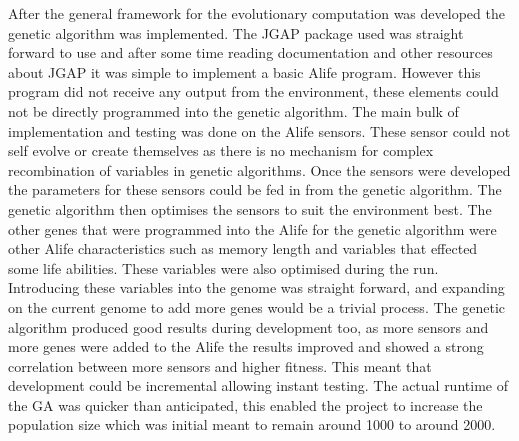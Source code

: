 \documentclass[12pt]{article}
\begin{document}
After the general framework for the evolutionary computation was developed the genetic algorithm was implemented. The JGAP package used
was straight forward to use and after some time reading documentation and other resources about JGAP it was simple to implement a basic
Alife program. However this program did not receive any output from the environment, these elements could not be directly programmed into
the genetic algorithm. The main bulk of implementation and testing was done on the Alife sensors. These sensor could not self evolve or 
create themselves as there is no mechanism for complex recombination of variables in genetic algorithms. Once the sensors were developed
the parameters for these sensors could be fed in from the genetic algorithm. The genetic algorithm then optimises the sensors to suit
the environment best. The other genes that were programmed into the Alife for the genetic algorithm were other Alife characteristics
such as memory length and variables that effected some life abilities. These variables were also optimised during the run. Introducing
these variables into the genome was straight forward, and expanding on the current genome to add more genes would be a trivial process.
The genetic algorithm produced good results during development too, as more sensors and more genes were added to the Alife the results
improved and showed a strong correlation between more sensors and higher fitness. This meant that development could be incremental allowing
instant testing. The actual runtime of the GA was quicker than anticipated, this enabled the project to increase the population size which
was initial meant to remain around 1000 to around 2000.
\end{document}
